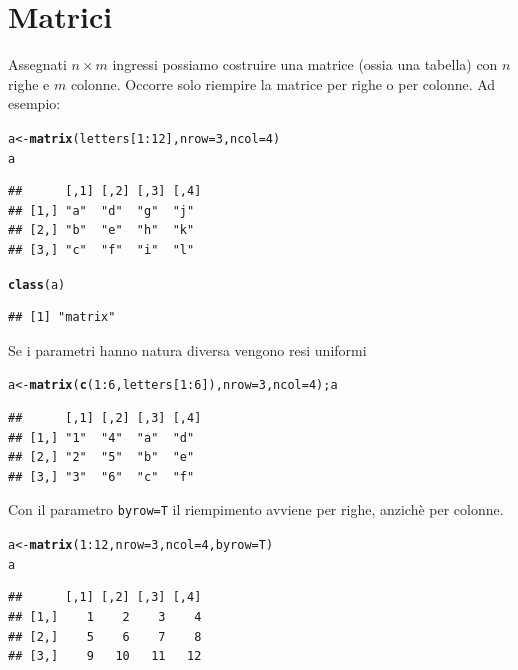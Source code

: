 \documentclass[onecolumn,12pt]{book}\usepackage[]{graphicx}\usepackage[]{color}
\makeatletter
\newcommand{\hlnum}[1]{\textcolor[rgb]{0.686,0.059,0.569}{#1}}%
\newcommand{\hlopt}[1]{\textcolor[rgb]{0,0,0}{#1}}%
\newcommand{\hlstd}[1]{\textcolor[rgb]{0.345,0.345,0.345}{#1}}%
\newcommand{\hlkwb}[1]{\textcolor[rgb]{0.69,0.353,0.396}{#1}}%
\newcommand{\hlkwc}[1]{\textcolor[rgb]{0.333,0.667,0.333}{#1}}%
\newcommand{\hlkwd}[1]{\textcolor[rgb]{0.737,0.353,0.396}{\textbf{#1}}}%
\newenvironment{kframe}{%
 \def\at@end@of@kframe{}%
 \ifinner\ifhmode%
  \def\at@end@of@kframe{\end{minipage}}%
  \begin{minipage}{\columnwidth}%
 \fi\fi%
 \def\FrameCommand##1{\hskip\@totalleftmargin \hskip-\fboxsep
 \colorbox{shadecolor}{##1}\hskip-\fboxsep
     \hskip-\linewidth \hskip-\@totalleftmargin \hskip\columnwidth}%
 \MakeFramed {\advance\hsize-\width
   \@totalleftmargin\z@ \linewidth\hsize
   \@setminipage}}%
 {\par\unskip\endMakeFramed%
 \at@end@of@kframe}
\newenvironment{knitrout}{}{} %
\makeatother
\begin{document}
\section{Matrici}

Assegnati $n\times m$ ingressi possiamo costruire una matrice (ossia una tabella) con $n$ righe e $m$ colonne. Occorre solo riempire la matrice per righe o per colonne.
Ad esempio:
\begin{knitrout}
\color{fgcolor}\begin{kframe}
\begin{alltt}
\hlstd{a}\hlkwb{<-}\hlkwd{matrix}\hlstd{(letters[}\hlnum{1}\hlopt{:}\hlnum{12}\hlstd{],}\hlkwc{nrow}\hlstd{=}\hlnum{3}\hlstd{,}\hlkwc{ncol}\hlstd{=}\hlnum{4}\hlstd{)}
\hlstd{a}
\end{alltt}
\begin{verbatim}
##      [,1] [,2] [,3] [,4]
## [1,] "a"  "d"  "g"  "j" 
## [2,] "b"  "e"  "h"  "k" 
## [3,] "c"  "f"  "i"  "l"
\end{verbatim}
\begin{alltt}
\hlkwd{class}\hlstd{(a)}
\end{alltt}
\begin{verbatim}
## [1] "matrix"
\end{verbatim}
\end{kframe}
\end{knitrout}
Se i parametri hanno natura diversa vengono resi uniformi
\begin{knitrout}
\color{fgcolor}\begin{kframe}
\begin{alltt}
\hlstd{a}\hlkwb{<-}\hlkwd{matrix}\hlstd{(}\hlkwd{c}\hlstd{(}\hlnum{1}\hlopt{:}\hlnum{6}\hlstd{,letters[}\hlnum{1}\hlopt{:}\hlnum{6}\hlstd{]),}\hlkwc{nrow}\hlstd{=}\hlnum{3}\hlstd{,}\hlkwc{ncol}\hlstd{=}\hlnum{4}\hlstd{);a}
\end{alltt}
\begin{verbatim}
##      [,1] [,2] [,3] [,4]
## [1,] "1"  "4"  "a"  "d" 
## [2,] "2"  "5"  "b"  "e" 
## [3,] "3"  "6"  "c"  "f"
\end{verbatim}
\end{kframe}
\end{knitrout}
Con il parametro \texttt{byrow=T} il riempimento avviene per righe, anzich\`e per colonne.
\begin{knitrout}
\color{fgcolor}\begin{kframe}
\begin{alltt}
 \hlstd{a}\hlkwb{<-}\hlkwd{matrix}\hlstd{(}\hlnum{1}\hlopt{:}\hlnum{12}\hlstd{,}\hlkwc{nrow}\hlstd{=}\hlnum{3}\hlstd{,}\hlkwc{ncol}\hlstd{=}\hlnum{4}\hlstd{,}\hlkwc{byrow}\hlstd{=T)}
 \hlstd{a}
\end{alltt}
\begin{verbatim}
##      [,1] [,2] [,3] [,4]
## [1,]    1    2    3    4
## [2,]    5    6    7    8
## [3,]    9   10   11   12
\end{verbatim}
\end{kframe}
\end{knitrout}
\end{document}
